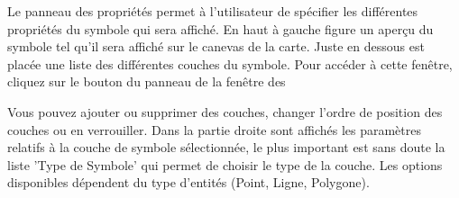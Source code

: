 

Le panneau des propriétés permet à l'utilisateur de spécifier les différentes propriétés du symbole qui sera affiché. En haut à gauche figure un aperçu du symbole tel qu'il sera affiché sur le canevas de la carte. Juste en dessous est placée une liste des différentes couches du symbole. Pour accéder à cette fenêtre, cliquez sur le bouton  du panneau  de la fenêtre des 


Vous pouvez ajouter ou supprimer des couches, changer l'ordre de position des couches ou en verrouiller. Dans la partie droite sont affichés les paramètres relatifs à la couche de symbole sélectionnée, le plus important est sans doute la liste 'Type de Symbole' qui permet de choisir le type de la couche. Les options disponibles dépendent du type d'entités (Point, Ligne, Polygone).

